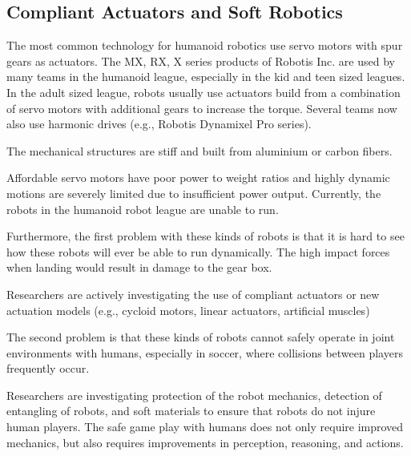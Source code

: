 \documentclass{article}
\begin{document}
\subsection{Compliant Actuators and Soft Robotics}

The most common technology for humanoid robotics use servo motors with spur gears as actuators.
The MX, RX, X series products of Robotis Inc. are used by many teams in the humanoid league, especially in the kid and teen sized leagues.
In the adult sized league, robots usually use actuators build from a combination of servo motors with additional gears to increase the torque.
Several teams now also use harmonic drives (e.g., Robotis Dynamixel Pro series).

The mechanical structures are stiff and built from aluminium or carbon fibers.

Affordable servo motors have poor power to weight ratios and highly dynamic motions are severely limited due to insufficient power output.
Currently, the robots in the humanoid robot league are unable to run.

Furthermore, the first problem with these kinds of robots is that it is hard to see how these robots will ever be able to run dynamically.
The high impact forces when landing would result in damage to the gear box.

Researchers are actively investigating the use of compliant actuators or new actuation models (e.g., cycloid motors, linear actuators, artificial muscles)

The second problem is that these kinds of robots cannot safely operate in joint environments with humans, especially in soccer, where collisions between players frequently occur.

Researchers are investigating protection of the robot mechanics, detection of entangling of robots, and soft materials to ensure that robots do not injure human players.
The safe game play with humans does not only require improved mechanics, but also requires improvements in perception, reasoning, and actions.


\end{document}
